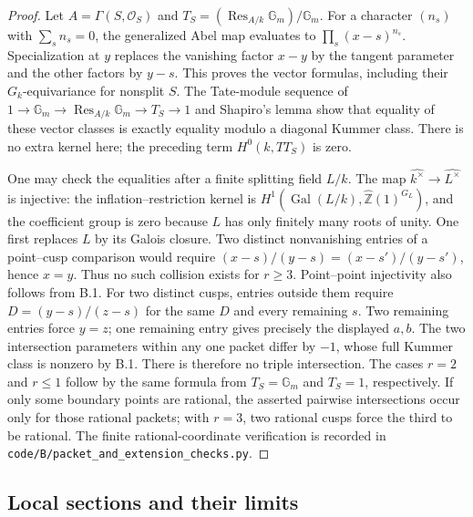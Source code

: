 \begin{proof}
Let $A=\Gamma(S,\mathcal O_S)$ and
$T_S=(\operatorname{Res}_{A/k}\mathbb G_m)/\mathbb G_m$.
For a character $(n_s)$ with $\sum_s n_s=0$, the generalized Abel map
evaluates to $\prod_s(x-s)^{n_s}$.  Specialization at $y$ replaces the
vanishing factor $x-y$ by the tangent parameter and the other factors
by $y-s$.  This proves the vector formulas, including their
$G_k$-equivariance for nonsplit $S$.
The Tate-module sequence of
$1\to\mathbb G_m\to\operatorname{Res}_{A/k}\mathbb G_m\to T_S\to1$
and Shapiro's lemma show that equality of these vector classes is
exactly equality modulo a diagonal Kummer class.  There is no extra
kernel here; the preceding term $H^0(k,TT_S)$ is zero.

One may check the equalities after a finite splitting field $L/k$.
The map $\widehat{k^\times}\to\widehat{L^\times}$ is injective:
the inflation--restriction kernel is
$H^1(\operatorname{Gal}(L/k),\widehat{\mathbb Z}(1)^{G_L})$,
and the coefficient group is zero because $L$ has only finitely
many roots of unity.  One first replaces $L$ by its Galois closure.
Two distinct nonvanishing entries of a point--cusp comparison would
require
$(x-s)/(y-s)=(x-s')/(y-s')$, hence $x=y$.  Thus no such collision
exists for $r\geq3$.  Point--point injectivity also follows from B.1.
For two distinct cusps, entries outside them require
$D=(y-s)/(z-s)$ for the same $D$ and every remaining $s$.
Two remaining entries force $y=z$; one remaining entry gives precisely
the displayed $a,b$.  The two intersection parameters within any one
packet differ by $-1$, whose full Kummer class is nonzero by B.1.
There is therefore no triple intersection.  The cases $r=2$ and
$r\leq1$ follow by the same formula from $T_S=\mathbb G_m$ and
$T_S=1$, respectively.  If only some boundary points are rational,
the asserted pairwise intersections occur only for those rational
packets; with $r=3$, two rational cusps force the third to be rational.
The finite rational-coordinate verification is recorded in
\texttt{code/B/packet\_and\_extension\_checks.py}.
\end{proof}

\subsection{Local sections and their limits}

